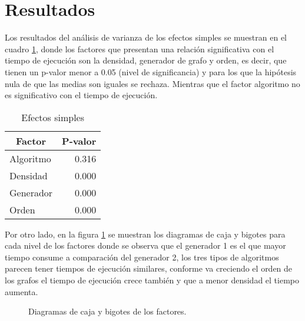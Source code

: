 \documentclass{article}
\begin{document}
\section*{Resultados}
Los resultados del análisis de varianza de los efectos simples se muestran en el cuadro \ref{cuadro1}, donde los factores que presentan una relación significativa con el tiempo de ejecución son la densidad, generador de grafo y orden, es decir, que tienen un p-valor menor a 0.05 (nivel de significancia) y para los que la hipótesis nula de que las medias son iguales se rechaza. Mientras que el factor algoritmo no es significativo con el tiempo de ejecución.
  
\begin{table}[H]
\centering
\caption{Efectos simples}
\begin{tabular}{|l|r|}
\hline
\multicolumn{1}{|c|}{\textbf{Factor}} & \multicolumn{1}{c|}{\textbf{P-valor}} \\ \hline
Algoritmo & 0.316 \\ \hline
Densidad & 0.000 \\ \hline
Generador & 0.000 \\ \hline
Orden & 0.000 \\ \hline
\end{tabular}
\label{cuadro1}
\end{table}

Por otro lado, en la figura \ref{Figura5} se muestran los diagramas de caja y bigotes para cada nivel de los factores donde se observa que el generador 1 es el que mayor tiempo consume a comparación del generador 2, los tres tipos de algoritmos parecen tener tiempos de ejecución similares, conforme va creciendo el orden de los grafos el tiempo de ejecución crece también y que a menor densidad el tiempo aumenta.   

\begin{figure}[H]
\centering
{}\hspace{5mm}
\vspace{5mm}
\hspace{5mm}
\vspace{5mm}
\caption{Diagramas de caja y bigotes de los factores. } \label{Figura5}
\end{figure}
\end{document}
